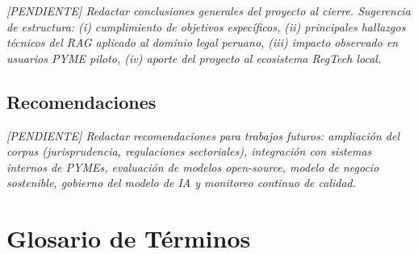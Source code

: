 \documentclass[12pt,a4paper,oneside]{report}
\newcommand{\pendiente}[1]{\textit{[PENDIENTE] #1}}
\begin{document}
\pendiente{Redactar conclusiones generales del proyecto al cierre. Sugerencia de estructura: (i) cumplimiento de objetivos específicos, (ii) principales hallazgos técnicos del RAG aplicado al dominio legal peruano, (iii) impacto observado en usuarios PYME piloto, (iv) aporte del proyecto al ecosistema RegTech local.}

\section{Recomendaciones}\label{sec:recomendaciones}

\pendiente{Redactar recomendaciones para trabajos futuros: ampliación del corpus (jurisprudencia, regulaciones sectoriales), integración con sistemas internos de PYMEs, evaluación de modelos open-source, modelo de negocio sostenible, gobierno del modelo de IA y monitoreo continuo de calidad.}


\chapter*{Glosario de Términos}
\end{document}
